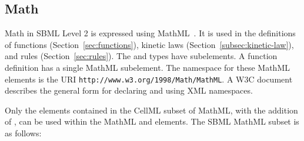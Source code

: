 \documentclass[10pt]{cekarticle}
\begin{document}
\subsection{Math}
\label{sec:formulas}

Math in SBML Level 2 is expressed using MathML~\citep{w3c:2000b}.
It is used in the definitions of functions
(Section~\ref{sec:functions}), kinetic laws
(Section~\ref{subsec:kinetic-law}), and rules (Section~\ref{sec:rules}).
The  and  types have
 subelements.  A function definition has a single
MathML  subelement. The namespace for these MathML elements is the URI
\texttt{http://www.w3.org/1998/Math/MathML}.  A W3C
document~\citep{bray:1999} describes the general form for
declaring and using XML namespaces.

Only the elements contained in the CellML subset of MathML, with
the addition of , can be used within the MathML
 and  elements. The SBML MathML subset
is as follows:
\end{document}
